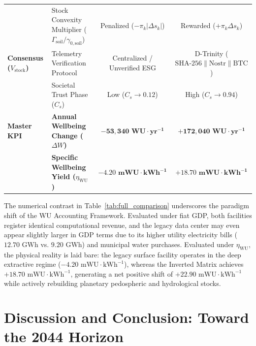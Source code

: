 \documentclass[aps,pre,twocolumn,10pt,superscriptaddress,amsmath,amssymb,amsfonts,floatfix,showkeys]{revtex4-2}
\begin{document}
\begin{table}[htbp]
\begin{ruledtabular}
{\begin{tabular}{llcc}
 & Stock Convexity Multiplier ($\Gamma_{\text{soil}}/\gamma_{0,\text{soil}}$) & Penalized ($-\pi_k|\Delta s_k|$) & Rewarded ($+\pi_k \Delta s_k$) \\
\colrule
\textbf{Consensus ($V_{\text{stock}}$)} & Telemetry Verification Protocol & Centralized / Unverified ESG & D-Trinity ($\text{SHA-256} \parallel \text{Nostr} \parallel \text{BTC}$) \\
 & Societal Trust Phase ($C_s$) & Low ($C_s \to 0.12$) & High ($C_s \to 0.94$) \\
\colrule
\textbf{Master KPI} & \textbf{Annual Wellbeing Change ($\Delta W$)} & $\mathbf{-53{,}340\text{ WU}\cdot\text{yr}^{-1}}$ & $\mathbf{+172{,}040\text{ WU}\cdot\text{yr}^{-1}}$ \\
 & \textbf{Specific Wellbeing Yield ($\eta_{\text{WU}}$)} & $\mathbf{-4.20\text{ mWU}\cdot\text{kWh}^{-1}}$ & $\mathbf{+18.70\text{ mWU}\cdot\text{kWh}^{-1}}$ \\
\end{tabular}%
}
\end{ruledtabular}
\end{table}

The numerical contrast in Table~\ref{tab:full_comparison} underscores the paradigm shift of the WU Accounting Framework. Evaluated under fiat GDP, both facilities register identical computational revenue, and the legacy data center may even appear slightly larger in GDP terms due to its higher utility electricity bills ($12.70\text{ GWh}$ vs. $9.20\text{ GWh}$) and municipal water purchases. Evaluated under $\eta_{\text{WU}}$, the physical reality is laid bare: the legacy surface facility operates in the deep extractive regime ($-4.20\text{ mWU}\cdot\text{kWh}^{-1}$), whereas the Inverted Matrix achieves $+18.70\text{ mWU}\cdot\text{kWh}^{-1}$, generating a net positive shift of $+22.90\text{ mWU}\cdot\text{kWh}^{-1}$ while actively rebuilding planetary pedospheric and hydrological stocks.

\section{Discussion and Conclusion: Toward the 2044 Horizon}
\end{document}
